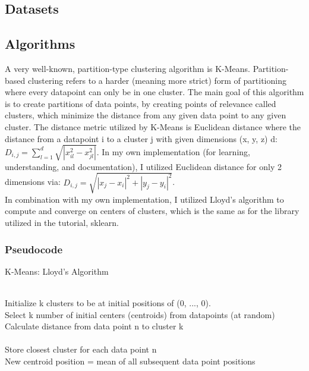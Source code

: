 \documentclass[10pt,twocolumn]{article}
\begin{document}
\subsection {Datasets}

\indent 


\subsection {Algorithms}

\indent A very well-known, partition-type clustering algorithm is K-Means. Partition-based clustering refers to a harder (meaning more strict) form of partitioning where every datapoint can only be in one cluster. The main goal of this algorithm is to create partitions of data points, by creating points of relevance called clusters, which minimize the distance from any given data point to any given cluster. The distance metric utilized by K-Means is Euclidean distance where the distance from a datapoint i to a cluster j with given dimensions (x, y, z) d:
\(D_{i, j} = \sum_{l=1}^d \sqrt{|x_{il}^2 - x_{jl}^2|} \). In my own implementation (for learning, understanding, and documentation), I utilized Euclidean distance for only 2 dimensions via: \(D_{i, j} = \sqrt{{|x_{j} - x_{i}|^2} + {|y_{j} - y_{i}|^2}} \). \\ In combination with my own implementation, I utilized Lloyd’s algorithm to compute and converge on centers of clusters, which is the same as for the library utilized in the tutorial, sklearn.

\subsubsection {Pseudocode}

\begin{algorithm}
  \caption{ K-Means: Lloyd's Algorithm }
  \begin{algorithmic}[1] \\
     Initialize k clusters to be at initial positions of (0, ..., 0).\\
     Select k number of initial centers (centroids) from datapoints (at random)
       \\
        Calculate distance from data point n to cluster k \\
      \EndFor \\
        \indent Store closest cluster for each data point n
     \EndFor \\
    New centroid position = mean of all subsequent data point positions
    \EndWhile
  \end{algorithmic}




\end{algorithm}
\end{document}
